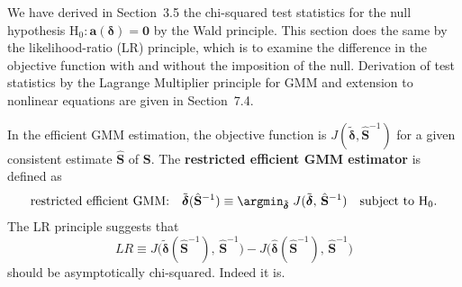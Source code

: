 
We have derived in Section~3.5 the chi-squared test statistics for the null hypothesis
$\mathrm{H}_0\colon \mathbf{a}(\boldsymbol{\delta}) = \mathbf{0}$ by the Wald principle.  This section does
the same by the likelihood-ratio (LR) principle, which is to examine the difference in the
objective function with and without the imposition of the null.  Derivation of test
statistics by the Lagrange Multiplier principle for GMM and extension to nonlinear
equations are given in Section~7.4.

In the efficient GMM estimation, the objective function is
$J(\tilde{\boldsymbol{\delta}}, \hat{\mathbf{S}}^{-1})$ for a given consistent estimate $\hat{\mathbf{S}}$ of
$\mathbf{S}$.  The \textbf{restricted efficient GMM estimator} is defined as
\begin{equation}
  \text{restricted efficient GMM:} \quad
  \tilde{\boldsymbol{\delta}}(\hat{\mathbf{S}}^{-1})
  \equiv \argmin_{\tilde{\boldsymbol{\delta}}}\;
  J(\tilde{\boldsymbol{\delta}},\, \hat{\mathbf{S}}^{-1})
  \quad \text{subject to } \mathrm{H}_0.
  \label{eq:3.7.1}
\end{equation}
The LR principle suggests that
\begin{equation}
  LR \equiv J\bigl(\tilde{\boldsymbol{\delta}}(\hat{\mathbf{S}}^{-1}),\,
  \hat{\mathbf{S}}^{-1}\bigr)
  - J\bigl(\hat{\boldsymbol{\delta}}(\hat{\mathbf{S}}^{-1}),\,
  \hat{\mathbf{S}}^{-1}\bigr)
  \label{eq:3.7.2}
\end{equation}
should be asymptotically chi-squared.  Indeed it is.

